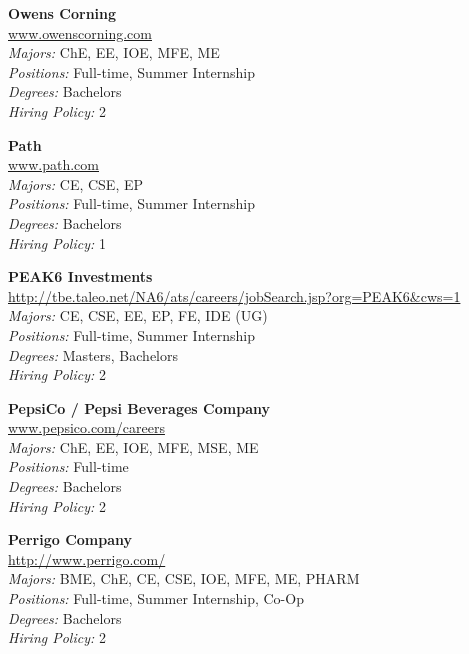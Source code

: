 \documentclass[twoside]{article}
\begin{document}
\begin{center}
\begin{multicols}{3}
\begin{minipage}{.9\columnwidth}{\Large\bf Owens Corning }\\
	\url{www.owenscorning.com}\\
	\emph{Majors:} ChE, EE, IOE, MFE, ME\\
	\emph{Positions:} Full-time, Summer Internship\\
	\emph{Degrees:} Bachelors\\
	\emph{Hiring Policy:} 2\\
\end{minipage}
 
\begin{minipage}{.9\columnwidth}{\Large\bf Path }\\
	\url{www.path.com}\\
	\emph{Majors:} CE, CSE, EP\\
	\emph{Positions:} Full-time, Summer Internship\\
	\emph{Degrees:} Bachelors\\
	\emph{Hiring Policy:} 1\\
\end{minipage}
 
\begin{minipage}{.9\columnwidth}{\Large\bf PEAK6 Investments }\\
	\url{http://tbe.taleo.net/NA6/ats/careers/jobSearch.jsp?org=PEAK6&cws=1}\\
	\emph{Majors:} CE, CSE, EE, EP, FE, IDE (UG)\\
	\emph{Positions:} Full-time, Summer Internship\\
	\emph{Degrees:} Masters, Bachelors\\
	\emph{Hiring Policy:} 2\\
\end{minipage}
 
\begin{minipage}{.9\columnwidth}{\Large\bf PepsiCo / Pepsi Beverages Company }\\
	\url{www.pepsico.com/careers}\\
	\emph{Majors:} ChE, EE, IOE, MFE, MSE, ME\\
	\emph{Positions:} Full-time\\
	\emph{Degrees:} Bachelors\\
	\emph{Hiring Policy:} 2\\
\end{minipage}
 
\begin{minipage}{.9\columnwidth}{\Large\bf Perrigo Company }\\
	\url{http://www.perrigo.com/}\\
	\emph{Majors:} BME, ChE, CE, CSE, IOE, MFE, ME, PHARM\\
	\emph{Positions:} Full-time, Summer Internship, Co-Op\\
	\emph{Degrees:} Bachelors\\
	\emph{Hiring Policy:} 2\\
\end{minipage}
 

\end{multicols}
\end{center}
\end{document}
